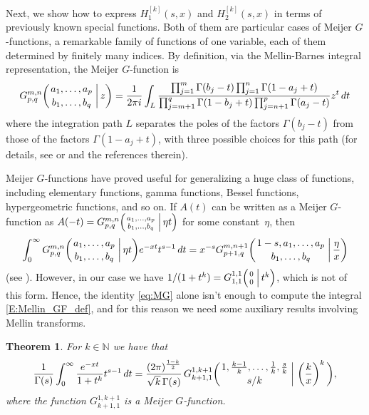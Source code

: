 \documentclass[11pt,a4paper]{amsart}
\newcommand{\parenG}[3]{\bigg(\genfrac{}{}{0pt}{}{#1}{#2} \,\bigg|\, #3\bigg)}
\newcommand{\tparenG}[3]{\Big(\genfrac{}{}{0pt}{}{#1}{#2} \,\Big|\, #3\Big)}
\theoremstyle{plain}
\newtheorem{theorem}{Theorem}[section]
\theoremstyle{plain}
\theoremstyle{remark}
\numberwithin{equation}{section}
\begin{document}
Next, we show how to express $H_1^{[k]}(s,x)$ and $H_2^{[k]}(s,x)$ in terms of previously known special functions. Both of them are particular cases of Meijer $G$-functions, a remarkable family of functions of one variable, each of them determined by finitely many indices. By definition, via the Mellin-Barnes integral representation, the Meijer $G$-function is
\[
  G_{p,q}^{m,n}\parenG{a_1, \dots, a_p}{b_1, \dots, b_q}{z} \\ 
  = \frac{1}{2\pi i} \int_L \frac{\prod_{j=1}^m\Gamma(b_j-t) 
  \prod_{j=1}^n \Gamma(1-a_j+t)}{\prod_{j=m+1}^q \Gamma(1-b_j+t) \prod_{j=n+1}^p \Gamma(a_j-t)}z^t\, dt
\]
where the integration path $L$ separates the poles of the factors $\Gamma(b_j-t)$ 
from those of the factors $\Gamma(1-a_j+t)$, with three possible choices for this path 
(for details, see \cite[\S\,16.17]{AsOl-NIST} or \cite{BS} and the references therein). 

Meijer $G$-functions have proved useful for generalizing a huge class of functions, including elementary functions, gamma functions, Bessel functions, hypergeometric functions, and so on. If $A(t)$ can be written as a Meijer $G$-function as 
$A(-t) = G_{p,q}^{m,n}\tparenG{a_1, \dots, a_p}{b_1, \dots, b_q}{\eta t}$ 
for some constant~$\eta$, then
\begin{equation}
\label{eq:MG}
  \int_{0}^{\infty} G_{p,q}^{m,n}\parenG{a_1, \dots, a_p}{b_1, \dots, b_q}{\eta t}e^{-xt}t^{s-1}\,dt 
  = x^{-s}G_{p+1,q}^{m,n+1}\parenG{1-s,a_1, \dots, a_p}{b_1, \dots, b_q}{\frac{\eta}{x}}
\end{equation}
(see \cite[\S\,5.5.2]{EMOT-HTF-v1}). 
However, in our case we have  
$1/(1+t^k) = G_{1,1}^{1,1}\tparenG{0}{0}{t^k}$, 
which is not of this form. Hence, the identity \eqref{eq:MG} alone isn't enough to compute the integral \eqref{E:Mellin_GF_def}, and for this reason we need some auxiliary results involving Mellin transforms.


\begin{theorem}
\label{teo:int1+tk}
For $k\in \mathbb{N}$ we have that
\begin{equation*}
  \frac{1}{\Gamma(s)} \int_{0}^{\infty} \frac{e^{-xt}}{1+t^k} t^{s-1} \,dt 
  = \frac{(2\pi)^{\frac{1-k}{2}}}{\sqrt{k}\,\Gamma(s)}\, G_{k+1,1}^{1,k+1}
  \parenG{1,\frac{k-1}{k},\dots, \frac{1}{k}, \frac{s}{k}}{s/k}{\left(\frac{k}{x}\right)^k}, 
\end{equation*}
where the function $G_{k+1,1}^{1,k+1}$ is a Meijer $G$-function. 
\end{theorem}
\end{document}
